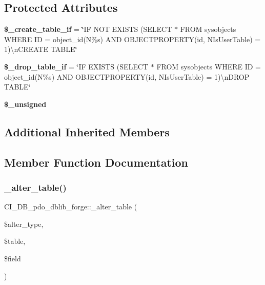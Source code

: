 \subsection*{Protected Attributes}
\begin{DoxyCompactItemize}
\item 
\mbox{\label{class_c_i___d_b__pdo__dblib__forge_a4185cec2bd225733a4a457fbd2372ff6}} 
{\bfseries \$\+\_\+create\+\_\+table\+\_\+if} = \char`\"{}IF N\+OT E\+X\+I\+S\+TS (S\+E\+L\+E\+CT $\ast$ F\+R\+OM sysobjects W\+H\+E\+RE ID = object\+\_\+id(N\textquotesingle{}\%s\textquotesingle{}) A\+ND O\+B\+J\+E\+C\+T\+P\+R\+O\+P\+E\+R\+TY(id, N\textquotesingle{}Is\+User\+Table\textquotesingle{}) = 1)\textbackslash{}n\+C\+R\+E\+A\+TE T\+A\+B\+LE\char`\"{}
\item 
\mbox{\label{class_c_i___d_b__pdo__dblib__forge_af0273f517c77fa6efbd76bd9ebb4746e}} 
{\bfseries \$\+\_\+drop\+\_\+table\+\_\+if} = \char`\"{}IF E\+X\+I\+S\+TS (S\+E\+L\+E\+CT $\ast$ F\+R\+OM sysobjects W\+H\+E\+RE ID = object\+\_\+id(N\textquotesingle{}\%s\textquotesingle{}) A\+ND O\+B\+J\+E\+C\+T\+P\+R\+O\+P\+E\+R\+TY(id, N\textquotesingle{}Is\+User\+Table\textquotesingle{}) = 1)\textbackslash{}n\+D\+R\+OP T\+A\+B\+LE\char`\"{}
\item 
{\bfseries \$\+\_\+unsigned}
\end{DoxyCompactItemize}
\subsection*{Additional Inherited Members}


\subsection{Member Function Documentation}
\mbox{\label{class_c_i___d_b__pdo__dblib__forge_aacc49b1b1373531e6b3a96638e669313}} 
\subsubsection{\texorpdfstring{\+\_\+alter\+\_\+table()}{\_alter\_table()}}
{\footnotesize\ttfamily C\+I\+\_\+\+D\+B\+\_\+pdo\+\_\+dblib\+\_\+forge\+::\+\_\+alter\+\_\+table (\begin{DoxyParamCaption}\item[{}]{\$alter\+\_\+type,  }\item[{}]{\$table,  }\item[{}]{\$field }\end{DoxyParamCaption})\hspace{0.3cm}{\ttfamily [protected]}}

